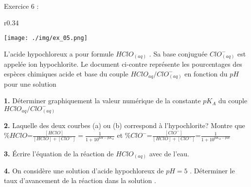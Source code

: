 \documentclass[12pt, french]{article}
\begin{document}
\vspace{-0.6cm}

\begin{Box2}{Exercice 6 : }

	\begin{wrapfigure}[8]{r}{0.34\textwidth}
  \begin{center}
	  \vspace{-0.6cm}
	\texttt{[image: ./img/ex\_05.png]}
  \end{center}
\end{wrapfigure}
	L’acide hypochloreux a pour formule $HClO_{(aq)}$ . Sa base conjuguée $ClO^-_{(aq)}$ est appelée ion hypochlorite. Le document ci-contre représente les pourcentages des espèces chimiques acide et base du couple $HClO_{aq}/ClO^-_{(aq)}$ en fonction du $pH$ pour une solution

	\textbf{1. }Déterminer graphiquement la valeur numérique de la constante $pK_A$ du couple $HClO_{aq}/ClO^-_{(aq)}$

	\textbf{2. }Laquelle des deux courbes (a) ou (b) correspond à l'hypochlorite? Montre que
 $\%HClO$=$ \frac{[HClO]}{[HClO] + [ClO^-]} = \frac{1}{ 1 + 10^{pH -pK_A}}$
et $\%ClO^-$=$\frac{[ClO^-]}{[HClO] + [ClO^-]}$=$ \frac{1}{ 1 + 10^{pK_A - pH}}$

\textbf{3. }Écrire l'équation de la réaction de $HClO_{(aq)}$
avec de l'eau.

\textbf{4. }On considère une solution d'acide hypochloreux de
$pH=5$ . Déterminer le taux d’avancement de la réaction
dans la solution .
\end{Box2}
\end{document}
